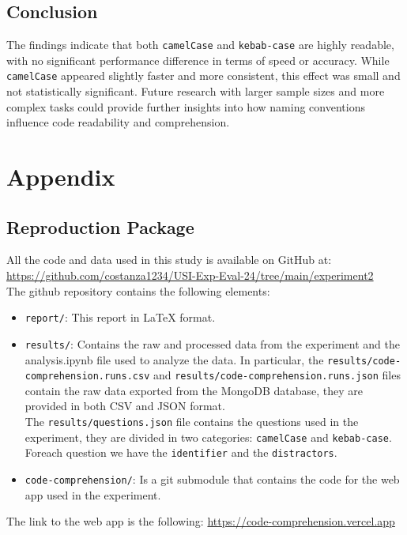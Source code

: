 \documentclass[unicode,11pt,a4paper,oneside,numbers=endperiod,openany]{scrartcl}
\begin{document}
\subsection{Conclusion}
The findings indicate that both \texttt{camelCase} and \texttt{kebab-case} are highly readable, with no significant performance difference in terms of speed or accuracy. While \texttt{camelCase} appeared slightly faster and more consistent, this effect was small and not statistically significant. Future research with larger sample sizes and more complex tasks could provide further insights into how naming conventions influence code readability and comprehension.

\section{Appendix}
\subsection{Reproduction Package}
All the code and data used in this study is available on GitHub at:
\\
\url{https://github.com/costanza1234/USI-Exp-Eval-24/tree/main/experiment2}
\\
The github repository contains the following elements:
\begin{itemize}
    \item \texttt{report/}: This report in LaTeX format.
    \item \texttt{results/}: Contains the raw and processed data from the experiment and the analysis.ipynb file used to analyze the data.
          In particular, the \texttt{results/code-comprehension.runs.csv} and \texttt{results/code-comprehension.runs.json} files contain the raw data exported from the MongoDB database,
          they are provided in both CSV and JSON format.
          \\
          The \texttt{results/questions.json} file contains the questions used in the experiment, they are divided in two categories: \texttt{camelCase} and \texttt{kebab-case}.
          Foreach question we have the \texttt{identifier} and the \texttt{distractors}.
    \item \texttt{code-comprehension/}: Is a git submodule that contains the code for the web app used in the experiment.
\end{itemize}

The link to the web app is the following: \url{https://code-comprehension.vercel.app}
\end{document}
